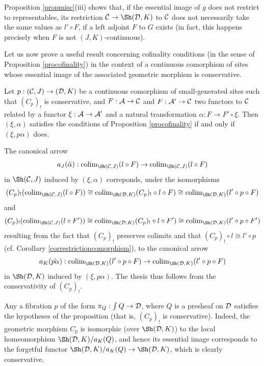\documentclass[a4paper,12pt]{article}
\begin{document}
\begin{remark}
	Proposition \ref{propmisc}(iii) shows that, if the essential image of $g$ does not restrict to representables, its restriction ${\cal C}\to \Sh({\cal D}, K)$ to $\cal C$ does not necessarily take the same values as $l'\circ F$, if a left adjoint $F$ to $G$ exists (in fact, this happens precisely when $F$ is not $(J, K)$-continuous).  
\end{remark}

Let us now prove a useful result concerning cofinality conditions (in the sense of Proposition \ref{procofinality}) in the context of a continuous comorphism of sites whose essential image of the associated geometric morphism is conservative.

\begin{proposition}\label{propcofinalcontinuous}
	Let $p:({\cal C}, J)\to ({\cal D}, K)$ be a continuous comorphism of small-generated sites such that $(C_{p})_{!}$ is conservative, and $F:{\cal A}\to {\cal C}$ and $F:{\cal A}'\to {\cal C}$ two functors to $\cal C$ related by a functor $\xi:{\cal A}\to {\cal A}'$ and a natural transformation $\alpha:F\to F'\circ \xi$. Then $(\xi, \alpha)$ satisfies the conditions of Proposition \ref{procofinality} if and only if $(\xi, p\alpha)$ does.
\end{proposition}

\begin{proofs}
The canonical arrow
\[
a_{J}(\tilde{\alpha}): \textup{colim}_{\Sh({\cal C}, J)}(l\circ F) \to \textup{colim}_{\Sh({\cal C}, J)}(l\circ F) 
\]
in $\Sh({\cal C}, J)$ induced by $(\xi, \alpha)$ correponds, under the isomorphisms
\[
(C_{p})_{!}(\textup{colim}_{\Sh({\cal C}, J)}(l\circ F))\cong \textup{colim}_{\Sh({\cal D}, K)}(C_{p})_{!}\circ l\circ F)\cong \textup{colim}_{\Sh({\cal D}, K)}(l'\circ p\circ F)
\]
and 
\[
(C_{p})_{!}(\textup{colim}_{\Sh({\cal C}, J)}(l\circ F'))\cong \textup{colim}_{\Sh({\cal D}, K)}(C_{p})_{!}\circ l\circ F')\cong \textup{colim}_{\Sh({\cal D}, K)}(l'\circ p\circ F')
\]
resulting from the fact that $(C_{p})_{!}$ preserves colimits and that $(C_{p})_{!}\circ l\cong l'\circ p$ (cf. Corollary \ref{correstrictioncomorphism}), to the canonical arrow
\[
a_{K}(\tilde{p\alpha}): \textup{colim}_{\Sh({\cal D}, K)}(l'\circ p\circ F) \to \textup{colim}_{\Sh({\cal D}, K)}(l'\circ p\circ F) 
\]
in $\Sh({\cal D}, K)$ induced by $(\xi, p\alpha)$. The thesis thus follows from the conservativity of $(C_{p})_{!}$. 
\end{proofs}

\begin{remark}\label{remlocalhomeocofinality}
	Any a fibration $p$ of the form $\pi_{Q}:{\int Q}\to {\cal D}$, where $Q$ is a presheaf on $\cal D$ satisfies the hypotheses of the proposition (that is, $(C_{p})_{!}$ is conservative). Indeed, the geometric morphism $C_{p}$ is isomorphic (over $\Sh({\cal D}, K)$) to the local homeomorphism $\Sh({\cal D}, K)\slash a_{K}(Q)$, and hence its essential image corresponds to the forgetful functor $\Sh({\cal D}, K)\slash a_{K}(Q)\to \Sh({\cal D}, K)$, which is clearly conservative.  
\end{remark}
\end{document}
